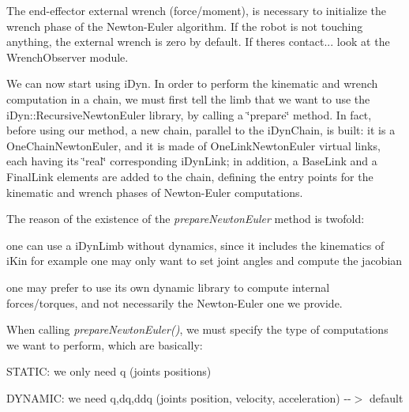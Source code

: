 The end-\/effector external wrench (force/moment), is necessary to initialize the wrench phase of the Newton-\/\+Euler algorithm. If the robot is not touching anything, the external wrench is zero by default. If there\textquotesingle{}s contact... look at the Wrench\+Observer module.


\begin{DoxyCode}{0}

\end{DoxyCode}


We can now start using i\+Dyn. In order to perform the kinematic and wrench computation in a chain, we must first tell the limb that we want to use the i\+Dyn\+::\+Recursive\+Newton\+Euler library, by calling a \char`\"{}prepare\char`\"{} method. In fact, before using our method, a new chain, parallel to the i\+Dyn\+Chain, is built\+: it is a One\+Chain\+Newton\+Euler, and it is made of One\+Link\+Newton\+Euler virtual links, each having its \char`\"{}real\char`\"{} corresponding i\+Dyn\+Link; in addition, a Base\+Link and a Final\+Link elements are added to the chain, defining the entry points for the kinematic and wrench phases of Newton-\/\+Euler computations.

The reason of the existence of the {\itshape prepare\+Newton\+Euler} method is twofold\+:
\begin{DoxyEnumerate}
\item one can use a i\+Dyn\+Limb without dynamics, since it includes the kinematics of i\+Kin for example one may only want to set joint angles and compute the jacobian
\item one may prefer to use its own dynamic library to compute internal forces/torques, and not necessarily the Newton-\/\+Euler one we provide.
\end{DoxyEnumerate}

When calling {\itshape prepare\+Newton\+Euler()}, we must specify the type of computations we want to perform, which are basically\+:


\begin{DoxyItemize}
\item STATIC\+: we only need q (joints positions)
\item DYNAMIC\+: we need q,dq,ddq (joints position, velocity, acceleration) -\/-\/$>$ default
\end{DoxyItemize}


\begin{DoxyCode}{0}

\end{DoxyCode}


